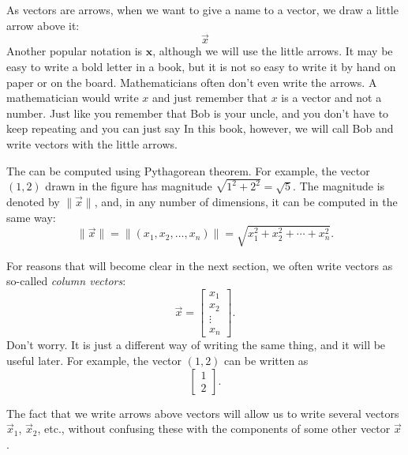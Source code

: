 As vectors are arrows, when we want to give a name to a vector,
we draw a little arrow above it:
\begin{equation*}
\vec{x}
\end{equation*}
Another popular notation is $\mathbf{x}$, although we will use the little
arrows.  It may be easy to write a bold letter in a book, but it is not so
easy to write it by hand on paper or on the board.
Mathematicians often don't even write the arrows.  A mathematician would
write $x$ and just remember that $x$ is a vector and not a number.
Just like you remember that Bob is your uncle, and you don't have to
keep repeating  and you can just say 
In this book, however, we will call Bob 
and write vectors with the little arrows.

The \emph{} can be computed using Pythagorean theorem.
For example,
the vector $(1,2)$ drawn in the figure has magnitude $\sqrt{1^2+2^2} =
\sqrt{5}$.  The magnitude is denoted by $\lVert \vec{x} \rVert$,
and, in any number of dimensions, it can be computed in the same way:
\begin{equation*}
\lVert \vec{x} \rVert
=
\lVert (x_1,x_2,\ldots,x_n) \rVert
=
\sqrt{x_1^2+x_2^2+\cdots+x_n^2} .
\end{equation*}

For reasons that will become clear in the next section, we often
write vectors as so-called
\emph{column vectors}:
\begin{equation*}
\vec{x} = 
\begin{bmatrix}
x_{1} \\ x_2 \\ \vdots \\ x_n
\end{bmatrix} .
\end{equation*}
Don't worry.  It is just a different way of writing the same thing, and
it will be useful later.  For example, the vector $(1,2)$ can be written as
\begin{equation*}
\begin{bmatrix}
1 \\ 2
\end{bmatrix} .
\end{equation*}

The fact that we write arrows above vectors will allow us to write several
vectors $\vec{x}_1$, $\vec{x}_2$, etc., without confusing these with the
components of some other vector $\vec{x}$.

